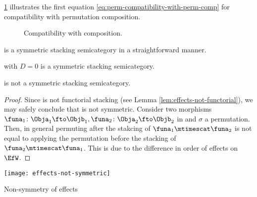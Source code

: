 \cref{fig:compatibility-perm-comp} illustrates the first equation \cref{eq:perm-compatibility-with-perm-comp} for compatibility with permutation composition.

\begin{figure}[h]
    \centering
     \qquad \qquad
    \caption{Compatibility with composition. }
    \label{fig:compatibility-perm-comp}
\end{figure}




\begin{example}
    \SetL is a symmetric stacking semicategory in a straightforward manner.
\end{example}


\begin{example}
    \LTI with $D=0$ is a symmetric stacking semicategory.
\end{example}

\begin{lemma}
    \label{lem:effects-not-symmetric}
    \Effects is not a symmetric stacking semicategory.
\end{lemma}
\begin{proof}
    Since \Effects is not functorial stacking (see Lemma \cref{lem:effects-not-functorial}), we may safely conclude that \Effects is not symmetric.
    Consider two morphisms $\funa_1\colon\Obja_1\fto\Objb_1, \funa_2\colon\Obja_2\fto\Objb_2$ in \Effects and $\sigma$ a permutation.
    Then, in general permuting after the stakcing of $\funa_1 \mtimescat \funa_2$ is not equal to applying the permutation before the stacking of $\funa_2 \mtimescat \funa_1$.
    This is due to the difference in order of effects on $\EfW$.
\end{proof}
\begin{marginfigure}
    \centering
    \texttt{[image: effects-not-symmetric]}
    \caption{Non-symmetry of effects}
    \label{fig:effects-not-symmetric}
\end{marginfigure}

